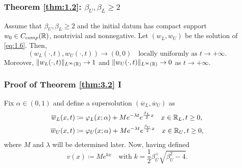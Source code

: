 
\begin{frame}
    \frametitle{Theorem \ref{thm:1.2}: \texorpdfstring{\(\beta_U, \beta_L\geq 2\)}{betaU, betaL >= 2}}
    \begin{theorem}
        Assume that \(\beta_U, \beta_L \geq 2\) and the initial datum has compact support \(w_{0} \in C_{comp}(\mathbb{R})\), nontrivial and nonnegative. Let \((w_L, w_{U})\) be the solution of \eqref{eq:1.6}. Then,
        \[
            (w_L(\cdot, t), w_{U}(\cdot, t)) \to (0, 0) \quad \text{locally uniformly as } t \to +\infty.
        \]
        Moreover, \(\lVert w_L(\cdot, t)\rVert_{L^{\infty}(\mathbb{R})} \to 1\) and \(\lVert w_U(\cdot, t)\rVert_{L^{\infty}(\mathbb{R})} \to 0\) as \(t \to +\infty\).
        \label{thm:3.2}
    \end{theorem}
\end{frame}


\begin{frame}
    \frametitle{Proof of Theorem \ref{thm:3.2} I}
    \begin{proofs}
        Fix \(\alpha \in (0, 1)\) and define a supersolution \((\overline{w}_L, \overline{w}_U)\) as
        \begin{align*}
            \overline{w}_L(x, t) & \coloneqq \varphi_L(x; \alpha) + M e^{-\lambda t} e^{\frac{\beta_L}{2}x} \quad x \in \mathbb{R}_L, t \geq 0, \\
            \overline{w}_U(x, t) & \coloneqq \varphi_U(x; \alpha) + M e^{-\lambda t} e^{\frac{\beta_U}{2}x} \quad x \in \mathbb{R}_U, t \geq 0,
        \end{align*}
        where \(M\) and \(\lambda\) will be determined later. Now, having defined 
        \[
            v(x) \coloneqq M e^{kx} \quad \text{with } k = \frac{1}{2}\beta_U^ + \sqrt{\beta_U^2 - 4}.
        \]
        
    \end{proofs}
\end{frame}


